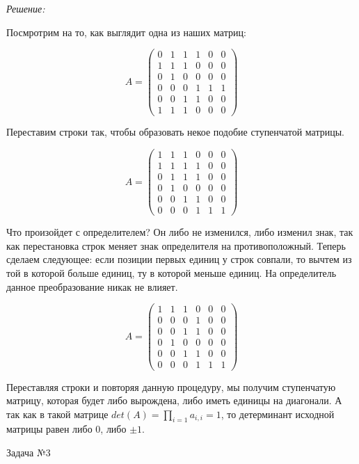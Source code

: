 \documentclass[10pt]{article}
\begin{document}
\textit{Решение:}

Посмротрим на то, как выглядит одна из наших матриц:

\[
A = \begin{pmatrix}
0 & 1 & 1 & 1 & 0 & 0 \\
1 & 1 & 1 & 0 & 0 & 0 \\
0 & 1 & 0 & 0 & 0 & 0 \\
0 & 0 & 0 & 1 & 1 & 1 \\
0 & 0 & 1 & 1 & 0 & 0 \\
1 & 1 & 1 & 0 & 0 & 0
\end{pmatrix}
\]

Переставим строки так, чтобы образовать некое подобие ступенчатой матрицы.

\[
A = \begin{pmatrix}
1 & 1 & 1 & 0 & 0 & 0 \\
1 & 1 & 1 & 1 & 0 & 0 \\
0 & 1 & 1 & 1 & 0 & 0 \\
0 & 1 & 0 & 0 & 0 & 0 \\
0 & 0 & 1 & 1 & 0 & 0 \\
0 & 0 & 0 & 1 & 1 & 1
\end{pmatrix}
\]

Что произойдет с определителем? Он либо не изменился, либо изменил знак, так как перестановка строк меняет знак определителя на противоположный. Теперь сделаем следующее: если позиции первых единиц у строк совпали, то вычтем из той в которой больше единиц, ту в которой меньше единиц. На определитель данное преобразование никак не влияет.

\[
A = \begin{pmatrix}
1 & 1 & 1 & 0 & 0 & 0 \\
0 & 0 & 0 & 1 & 0 & 0 \\
0 & 0 & 1 & 1 & 0 & 0 \\
0 & 1 & 0 & 0 & 0 & 0 \\
0 & 0 & 1 & 1 & 0 & 0 \\
0 & 0 & 0 & 1 & 1 & 1
\end{pmatrix}
\]

Переставляя строки и повторяя данную процедуру, мы получим ступенчатую матрицу, которая будет либо вырождена, либо иметь единицы на диагонали. А так как в такой матрице $det(A) = \prod_{i=1} a_{i,i} = 1$, то детерминант исходной матрицы равен либо 0, либо $\pm 1$.

\hspace{2mm}

Задача №3
\end{document}
